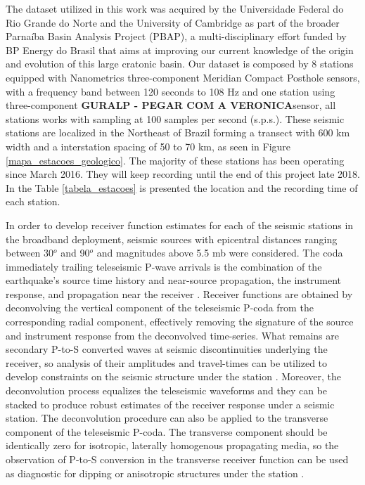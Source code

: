 \documentclass[paper,11pt]{geophysics}
\begin{document}
The dataset utilized in this work was acquired by the Universidade Federal do Rio Grande do Norte and the University of Cambridge as part of the broader Parnaíba Basin Analysis Project (PBAP), a multi-disciplinary effort funded by BP Energy do Brasil that aims at improving our current knowledge of the origin and evolution of this large cratonic basin. Our dataset is composed by 8 stations equipped with Nanometrics three-component Meridian Compact Posthole sensors, with a frequency band between 120 seconds to 108 Hz and one station using three-component \textbf{\LARGE GURALP - PEGAR COM A VERONICA}sensor, all stations works with  sampling at 100 samples per second (s.p.s.). These seismic stations are localized in the Northeast of Brazil forming a transect with 600 km width and a interstation spacing of 50 to 70 km, as seen in Figure \ref{mapa_estacoes_geologico}. The majority of these stations has been operating since March 2016. They will keep recording until the end of this project late 2018. In the Table \ref{tabela_estacoes} is presented the location and the recording time of each station. 

In order to develop receiver function estimates for each of the seismic stations in the broadband deployment, seismic sources with epicentral distances ranging between 30$^o$ and 90$^o$ and magnitudes above 5.5 mb were considered. The coda immediately trailing teleseismic P-wave arrivals is the combination of the earthquake's source time history and near-source propagation, the instrument response, and propagation near the receiver \citep{langston_structure_1979,ammon_isolation_1991}. Receiver functions are obtained by deconvolving the vertical component of the teleseismic P-coda from the corresponding radial component, effectively removing the signature of the source and instrument response from the deconvolved time-series. What remains are secondary P-to-S converted waves at seismic discontinuities underlying the receiver, so analysis of their amplitudes and travel-times can be utilized to develop constraints on the seismic structure under the station \citep{owens_seismic_1984,ammon_nonuniqueness_1990}. Moreover, the deconvolution process equalizes the teleseismic waveforms and they can be stacked to produce robust estimates of the receiver response under a seismic station. The deconvolution procedure can also be applied to the transverse component of the teleseismic P-coda. The transverse component should be identically zero for isotropic, laterally homogenous propagating media, so the observation of P-to-S conversion in the transverse receiver function can be used as diagnostic for dipping or anisotropic structures under the station \citep{cassidy_numerical_1992}.
\end{document}
